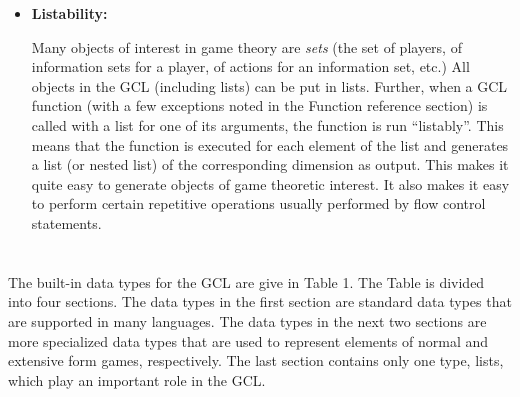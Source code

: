 \begin{itemize}
\item {\bf Listability: } 

Many objects of interest in game theory are {\it sets} (the set of
players, of information sets for a player, of actions for an
information set, etc.)  All objects in the GCL (including lists) can
be put in lists.  Further, when a GCL function (with a few exceptions
noted in the Function reference section) is called with a list for
one of its arguments, the function is run ``listably''.  This means
that the function is executed for each element of the list and
generates a list (or nested list) of the corresponding dimension as
output.  This makes it quite easy to generate objects of game
theoretic interest.  It also makes it easy to perform certain
repetitive operations usually performed by flow control statements.
\end{itemize}

\section{}

The built-in data types for the GCL are give in Table 1.  The Table is
divided into four sections. The data types in the first section are
standard data types that are supported in many languages.  The data
types in the next two sections are more specialized data types that
are used to represent elements of normal and extensive form games,
respectively.  The last section contains only one type, lists, which
play an important role in the GCL.

\medskip

